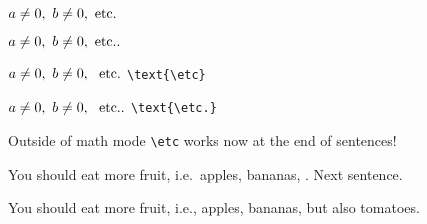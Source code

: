 \documentclass{article}
\makeatletter
\newcommand*{\textetc}{%
        \@ifnextchar{.}
            {etc}
            {etc.\@\xspace}%
}
\newcommand*{\mathetc}{%
        \@ifnextchar{.}
            {\text{etc}}
            {\text{etc.}}%
}
\newcommand*{\etc}{%
    \ifmmode
        \expandafter\mathetc
    \else
        \expandafter\textetc
    \fi
}
\makeatother
\begin{document}
\noindent
    $a \ne 0,\ b \ne 0,\ \etc$\par\noindent
    $a \ne 0,\ b \ne 0,\ \etc.$\par\noindent

    \medskip\noindent
    $a \ne 0,\ b \ne 0,\ \text{\etc}$ \quad \verb|\text{\etc}|\par\noindent
    $a \ne 0,\ b \ne 0,\ \text{\etc.}$ \quad \verb|\text{\etc.}|\par\noindent

    \bigskip
    \noindent
    Outside of math mode \verb|\etc| works now at the end of sentences!

    \noindent
    You should eat more fruit, i.e.\ apples, bananas, \etc. Next sentence.

    \noindent
    You should eat more fruit, i.e., apples, bananas, \etc but also tomatoes.
\end{document}
